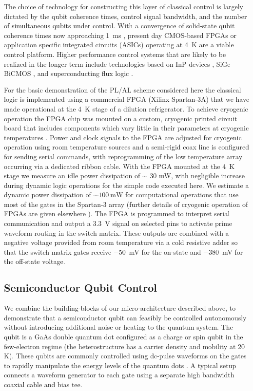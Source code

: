 The choice of technology for constructing this layer of classical control is largely dictated by the qubit coherence times, control signal bandwidth, and the number of simultaneous qubits under control. With a convergence of solid-state qubit coherence times now approaching \SI{1}{\milli\second} \cite{nature11449,nphys1856,doi:10.1063/1.4807015}, present day CMOS-based FPGAs or application specific integrated circuits (ASICs) operating at \SI{4}{\kelvin} are a viable control platform. Higher performance control systems that are likely to be realized in the longer term include technologies based on InP devices \cite{6005342}, SiGe BiCMOS \cite{5471127,YOU2005121}, and superconducting flux logic \cite{doi:10.1063/1.3585849,Johnson_2010}.

For the basic demonstration of the PL/AL scheme considered here the classical logic is implemented using a commercial FPGA (Xilinx Spartan-3A) that we have made operational at the \SI{4}{\kelvin} stage of a dilution refrigerator. To achieve cryogenic operation the FPGA chip was mounted on a custom, cryogenic printed circuit board that includes components which vary little in their parameters at cryogenic temperatures \cite{doi:10.1063/1.3681195, doi:10.1063/1.4900948}. Power and clock signals to the FPGA are adjusted for cryogenic operation using room temperature sources and a semi-rigid coax line is configured for sending serial commands, with reprogramming of the low temperature array occurring via a dedicated ribbon cable. With the FPGA mounted at the \SI{4}{\kelvin} stage we measure an idle power dissipation of $\sim$ 30 mW, with negligible increase during dynamic logic operations for the simple code executed here. We estimate a dynamic power dissipation of $\sim \SI{100}{\milli\watt}$ for computational operations that use most of the gates in the Spartan-3 array (further details of cryogenic operation of FPGAs are given elsewhere \cite{doi:10.1063/1.4939094}). The FPGA is programmed to interpret serial communication and output a \SI{3.3}{\volt} signal on selected pins to activate prime waveform routing in the switch matrix. These outputs are combined with a negative voltage provided from room temperature via a cold resistive adder so that the switch matrix gates receive \SI{-50}{\milli\volt} for the on-state and \SI{-380}{\milli\volt} for the off-state voltage.


\subsection{Semiconductor Qubit Control}
We combine the building-blocks of our micro-architecture described above, to demonstrate that a semiconductor qubit can feasibly be controlled autonomously without introducing additional noise or heating to the quantum system. The qubit is a GaAs double quantum dot configured as a charge or spin qubit in the few-electron regime (the heterostructure has a carrier density  and mobility  at 20 K). These qubits are commonly controlled using dc-pulse waveforms on the gates to rapidly manipulate the energy levels of the quantum dots \cite{petta}. A typical setup connects a waveform generator to each gate using a separate high bandwidth coaxial cable and bias tee.

